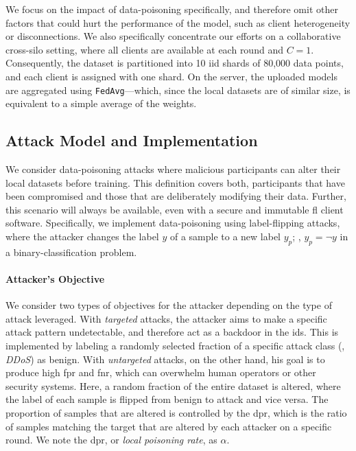 We focus on the impact of data-poisoning specifically, and therefore omit other factors that could hurt the performance of the model, such as client heterogeneity or disconnections.
We also specifically concentrate our efforts on a collaborative cross-silo setting, where all clients are available at each round and $C=1$.
Consequently, the dataset is partitioned into 10 \gls{iid} shards of 80,000 data points, and each client is assigned with one shard.
On the server, the uploaded models are aggregated using \texttt{FedAvg}---which, since the local datasets are of similar size, is equivalent to a simple average of the weights.

\subsection{Attack Model and Implementation\label{sec:assess.method.poisoning}}

We consider data-poisoning attacks where malicious participants can alter their local datasets before training.
This definition covers both, participants that have been compromised and those that are deliberately modifying their data.
Further, this scenario will always be available, even with a secure and immutable \gls{fl} client software.
Specifically, we implement data-poisoning using label-flipping attacks, where the attacker changes the label $y$ of a sample to a new label $y_p$; \ie, $y_p = \neg y$ in a binary-classification problem.

\paragraph{Attacker's Objective}

We consider two types of objectives for the attacker depending on the type of attack leveraged.
With \emph{targeted} attacks, the attacker aims to make a specific attack pattern undetectable, and therefore act as a backdoor in the \gls{ids}.
This is implemented by labeling a randomly selected fraction of a specific attack class (\eg, \emph{DDoS}) as benign.
With \emph{untargeted} attacks, on the other hand, his goal is to produce high \gls{fpr} and \gls{fnr}, which can overwhelm human operators or other security systems.
Here, a random fraction of the entire dataset is altered, where the label of each sample is flipped from benign to attack and vice versa.
The proportion of samples that are altered is controlled by the \gls{dpr}, which is the ratio of samples matching the target that are altered by each attacker on a specific round.
We note the \gls{dpr}, or \emph{local poisoning rate}, as $\alpha$.


